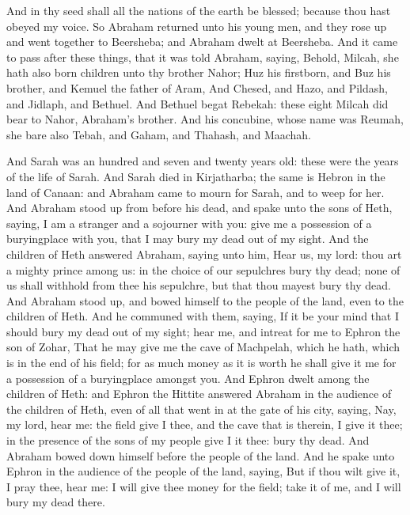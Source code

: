 \begin{biblechapter}
\verse And in thy seed shall all the nations of the earth be blessed; because thou hast obeyed my voice.
\verse So Abraham returned unto his young men, and they rose up and went together to Beersheba; and Abraham dwelt at Beersheba.
 And it came to pass after these things, that it was told Abraham, saying, Behold, Milcah, she hath also born children unto thy brother Nahor;
\verse Huz his firstborn, and Buz his brother, and Kemuel the father of Aram,
\verse And Chesed, and Hazo, and Pildash, and Jidlaph, and Bethuel.
\verse And Bethuel begat Rebekah: these eight Milcah did bear to Nahor, Abraham's brother.
\verse And his concubine, whose name was Reumah, she bare also Tebah, and Gaham, and Thahash, and Maachah.
\end{biblechapter}

\begin{biblechapter} %
 And Sarah was an hundred and seven and twenty years old: these were the years of the life of Sarah.
\verse And Sarah died in Kirjatharba; the same is Hebron in the land of Canaan: and Abraham came to mourn for Sarah, and to weep for her.
\verse And Abraham stood up from before his dead, and spake unto the sons of Heth, saying,
\verse I am a stranger and a sojourner with you: give me a possession of a buryingplace with you, that I may bury my dead out of my sight.
\verse And the children of Heth answered Abraham, saying unto him,
\verse Hear us, my lord: thou art a mighty prince among us: in the choice of our sepulchres bury thy dead; none of us shall withhold from thee his sepulchre, but that thou mayest bury thy dead.
\verse And Abraham stood up, and bowed himself to the people of the land, even to the children of Heth.
\verse And he communed with them, saying, If it be your mind that I should bury my dead out of my sight; hear me, and intreat for me to Ephron the son of Zohar,
\verse That he may give me the cave of Machpelah, which he hath, which is in the end of his field; for as much money as it is worth he shall give it me for a possession of a buryingplace amongst you.
\verse And Ephron dwelt among the children of Heth: and Ephron the Hittite answered Abraham in the audience of the children of Heth, even of all that went in at the gate of his city, saying,
\verse Nay, my lord, hear me: the field give I thee, and the cave that is therein, I give it thee; in the presence of the sons of my people give I it thee: bury thy dead.
\verse And Abraham bowed down himself before the people of the land.
\verse And he spake unto Ephron in the audience of the people of the land, saying, But if thou wilt give it, I pray thee, hear me: I will give thee money for the field; take it of me, and I will bury my dead there.

\end{biblechapter}
